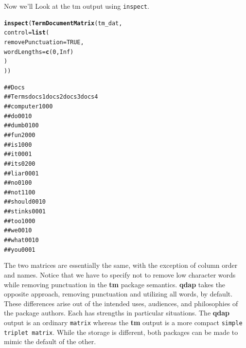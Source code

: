 \documentclass{article}\usepackage[]{graphicx}\usepackage[]{color}
\makeatletter
\newcommand{\hlnum}[1]{\textcolor[rgb]{0.686,0.059,0.569}{#1}}%
\newcommand{\hlstd}[1]{\textcolor[rgb]{0.345,0.345,0.345}{#1}}%
\newcommand{\hlkwc}[1]{\textcolor[rgb]{0.333,0.667,0.333}{#1}}%
\newcommand{\hlkwd}[1]{\textcolor[rgb]{0.737,0.353,0.396}{\textbf{#1}}}%
\newenvironment{kframe}{%
 \def\at@end@of@kframe{}%
 \ifinner\ifhmode%
  \def\at@end@of@kframe{\end{minipage}}%
  \begin{minipage}{\columnwidth}%
 \fi\fi%
 \def\FrameCommand##1{\hskip\@totalleftmargin \hskip-\fboxsep
 \colorbox{shadecolor}{##1}\hskip-\fboxsep
     \hskip-\linewidth \hskip-\@totalleftmargin \hskip\columnwidth}%
 \MakeFramed {\advance\hsize-\width
   \@totalleftmargin\z@ \linewidth\hsize
   \@setminipage}}%
 {\par\unskip\endMakeFramed%
 \at@end@of@kframe}
\newenvironment{knitrout}{}{} %
\makeatother
\begin{document}
Now we'll Look at the tm output using \texttt{inspect}.

\begin{knitrout}
\color{fgcolor}\begin{kframe}
\begin{alltt}
\hlkwd{inspect}\hlstd{(}\hlkwd{TermDocumentMatrix}\hlstd{(tm_dat,}
    \hlkwc{control} \hlstd{=} \hlkwd{list}\hlstd{(}
        \hlkwc{removePunctuation} \hlstd{=} \hlnum{TRUE}\hlstd{,}
        \hlkwc{wordLengths}\hlstd{=}\hlkwd{c}\hlstd{(}\hlnum{0}\hlstd{,} \hlnum{Inf}\hlstd{)}
    \hlstd{)}
\hlstd{))}
\end{alltt}
\end{kframe}
\end{knitrout}


\begin{knitrout}
\color{fgcolor}\begin{kframe}
\begin{alltt}
##           Docs
## Terms      docs 1 docs 2 docs 3 docs 4
##   computer      1      0      0      0
##   do            0      0      1      0
##   dumb          0      1      0      0
##   fun           2      0      0      0
##   is            1      0      0      0
##   it            0      0      0      1
##   its           0      2      0      0
##   liar          0      0      0      1
##   no            0      1      0      0
##   not           1      1      0      0
##   should        0      0      1      0
##   stinks        0      0      0      1
##   too           1      0      0      0
##   we            0      0      1      0
##   what          0      0      1      0
##   you           0      0      0      1
\end{alltt}
\end{kframe}
\end{knitrout}

The two matrices are essentially the same, with the exception of column order and names.  Notice that we have to specify not to remove low character words while removing punctuation in the \textbf{tm} package semantics.  \textbf{qdap} takes the opposite approach, removing punctuation and utilizing all words, by default.  These differences arise out of the intended uses, audiences, and philosophies of the package authors.  Each has strengths in particular situations.  The \textbf{qdap} output is an ordinary \texttt{matrix} whereas the \textbf{tm} output is a more compact \texttt{simple triplet matrix}.  While the storage is different, both packages can be made to mimic the default of the other.  
\end{document}
